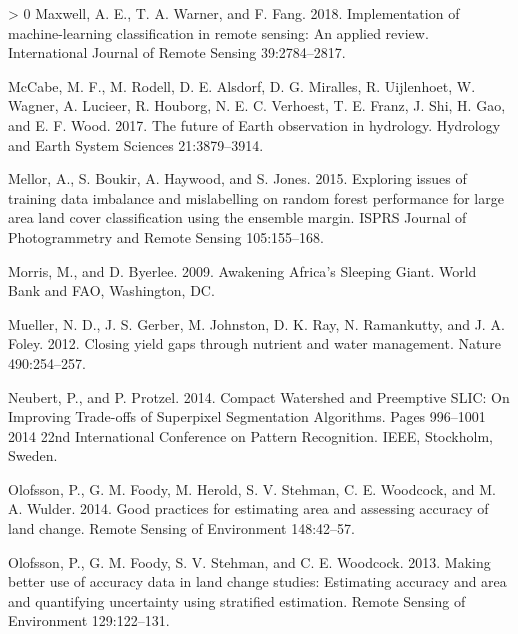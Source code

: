 \documentclass[11pt,a4paper]{article}
\newlength{\cslhangindent}
\newenvironment{CSLReferences}[3] %
 {%
  \setlength{\parindent}{0pt}
  \ifodd #1 \everypar{\setlength{\hangindent}{\cslhangindent}}\ignorespaces\fi
  \ifnum #2 > 0
  \setlength{\parskip}{#2\baselineskip}
  \fi
 }%
 {}
\begin{document}
\begin{CSLReferences}{1}{0}
\leavevmode\hypertarget{ref-MaxwellImplementationmachinelearningclassification2018}{}%
Maxwell, A. E., T. A. Warner, and F. Fang. 2018. Implementation of
machine-learning classification in remote sensing: An applied review.
International Journal of Remote Sensing 39:2784--2817.

\leavevmode\hypertarget{ref-McCabefutureEarthobservation2017}{}%
McCabe, M. F., M. Rodell, D. E. Alsdorf, D. G. Miralles, R. Uijlenhoet,
W. Wagner, A. Lucieer, R. Houborg, N. E. C. Verhoest, T. E. Franz, J.
Shi, H. Gao, and E. F. Wood. 2017. The future of {Earth} observation in
hydrology. Hydrology and Earth System Sciences 21:3879--3914.

\leavevmode\hypertarget{ref-mellorExploringIssuesTraining2015}{}%
Mellor, A., S. Boukir, A. Haywood, and S. Jones. 2015. Exploring issues
of training data imbalance and mislabelling on random forest performance
for large area land cover classification using the ensemble margin.
ISPRS Journal of Photogrammetry and Remote Sensing 105:155--168.

\leavevmode\hypertarget{ref-morrisAwakeningAfricaSleeping2009}{}%
Morris, M., and D. Byerlee. 2009. Awakening {Africa}'s {Sleeping Giant}.
{World Bank and FAO}, {Washington, DC}.

\leavevmode\hypertarget{ref-muellerClosingYieldGaps2012}{}%
Mueller, N. D., J. S. Gerber, M. Johnston, D. K. Ray, N. Ramankutty, and
J. A. Foley. 2012. Closing yield gaps through nutrient and water
management. Nature 490:254--257.

\leavevmode\hypertarget{ref-neubertCompactWatershedPreemptive2014}{}%
Neubert, P., and P. Protzel. 2014. Compact {Watershed} and {Preemptive
SLIC}: {On Improving Trade}-offs of {Superpixel Segmentation
Algorithms}. Pages 996--1001 2014 22nd {International Conference} on
{Pattern Recognition}. {IEEE}, {Stockholm, Sweden}.

\leavevmode\hypertarget{ref-OlofssonGoodpracticesestimating2014}{}%
Olofsson, P., G. M. Foody, M. Herold, S. V. Stehman, C. E. Woodcock, and
M. A. Wulder. 2014. Good practices for estimating area and assessing
accuracy of land change. Remote Sensing of Environment 148:42--57.

\leavevmode\hypertarget{ref-OlofssonMakingbetteruse2013}{}%
Olofsson, P., G. M. Foody, S. V. Stehman, and C. E. Woodcock. 2013.
Making better use of accuracy data in land change studies: {Estimating}
accuracy and area and quantifying uncertainty using stratified
estimation. Remote Sensing of Environment 129:122--131.


\end{CSLReferences}
\end{document}

